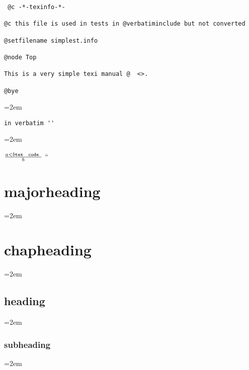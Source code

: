 \documentclass{book}
\newcommand{\GNUTexinfoplaceholder}[1]{}
\newcommand{\GNUTexinfonopagebreakheading}[2]{\let\clearpage\relax \let\cleardoublepage\relax \let\thispagestyle\GNUTexinfoplaceholder #1{#2}}
\begin{document}
\endgroup{}%
\begin{verbatim}
 @c -*-texinfo-*-

@c this file is used in tests in @verbatiminclude but not converted

@setfilename simplest.info

@node Top

This is a very simple texi manual @  <>.

@bye
\end{verbatim}
\par\begingroup\obeylines\obeyspaces\frenchspacing\leftskip=2em\relax\parskip=0pt\relax\ttfamily{}%

\endgroup{}%
\begin{verbatim}
in verbatim ''
\end{verbatim}
\par\begingroup\obeylines\obeyspaces\frenchspacing\leftskip=2em\relax\parskip=0pt\relax\ttfamily{}%





$\frac{a < b \texttt{tex \hbox{ code }}}{b}$ ``

\endgroup{}%
\GNUTexinfonopagebreakheading{\chapter*}{majorheading}
\par\begingroup\obeylines\obeyspaces\frenchspacing\leftskip=2em\relax\parskip=0pt\relax\ttfamily{}%

\endgroup{}%
\GNUTexinfonopagebreakheading{\chapter*}{chapheading}
\par\begingroup\obeylines\obeyspaces\frenchspacing\leftskip=2em\relax\parskip=0pt\relax\ttfamily{}%

\endgroup{}%
\GNUTexinfonopagebreakheading{\section*}{heading}
\par\begingroup\obeylines\obeyspaces\frenchspacing\leftskip=2em\relax\parskip=0pt\relax\ttfamily{}%

\endgroup{}%
\GNUTexinfonopagebreakheading{\subsection*}{subheading}
\par\begingroup\obeylines\obeyspaces\frenchspacing\leftskip=2em\relax\parskip=0pt\relax\ttfamily{}%
\end{document}

